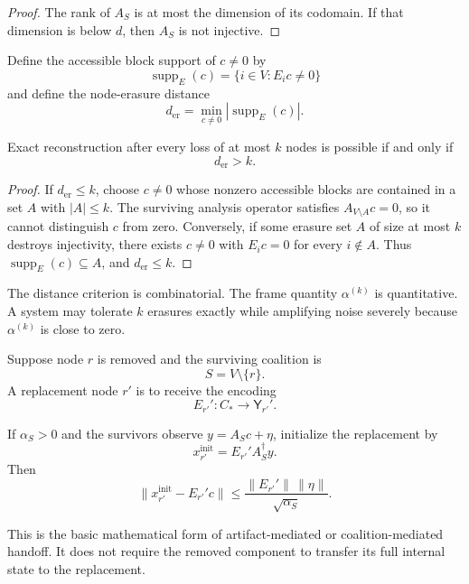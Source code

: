 \begin{proof}
The rank of \(A_S\) is at most the dimension of its codomain. If that
dimension is below \(d\), then \(A_S\) is not injective.
\end{proof}

Define the accessible block support of \(c\neq0\) by
\[
\operatorname{supp}_E(c)
=
\{i\in V:E_ic\neq0\}
\]
and define the node-erasure distance
\[
\boxed{
d_{\mathrm{er}}
=
\min_{c\neq0}|\operatorname{supp}_E(c)|.
}
\]

\begin{SRWTtheorem}
\label{SRWT:thm:erasure-distance}
Exact reconstruction after every loss of at most \(k\) nodes is possible if
and only if
\[
\boxed{
d_{\mathrm{er}}>k.
}
\]
\end{SRWTtheorem}

\begin{proof}
If \(d_{\mathrm{er}}\leq k\), choose \(c\neq0\) whose nonzero accessible
blocks are contained in a set \(A\) with \(|A|\leq k\). The surviving analysis
operator satisfies \(A_{V\setminus A}c=0\), so it cannot distinguish \(c\)
from zero. Conversely, if some erasure set \(A\) of size at most \(k\) destroys
injectivity, there exists \(c\neq0\) with \(E_ic=0\) for every \(i\notin A\).
Thus \(\operatorname{supp}_E(c)\subseteq A\), and
\(d_{\mathrm{er}}\leq k\).
\end{proof}

The distance criterion is combinatorial. The frame quantity
\(\alpha^{(k)}\) is quantitative. A system may tolerate \(k\) erasures exactly
while amplifying noise severely because \(\alpha^{(k)}\) is close to zero.


Suppose node \(r\) is removed and the surviving coalition is
\[
S=V\setminus\{r\}.
\]
A replacement node \(r'\) is to receive the encoding
\[
E_{r'}':C_*\to\mathsf Y_{r'}'.
\]

\begin{SRWTcorollary}\label{SRWT:cor:handoff-initialization}
If \(\alpha_S>0\) and the survivors observe \(y=A_Sc+\eta\), initialize the
replacement by
\[
x_{r'}^{\mathrm{init}}
=E_{r'}'A_S^\dagger y.
\]
Then
\[
\boxed{
\|x_{r'}^{\mathrm{init}}-E_{r'}'c\|
\leq
\frac{\|E_{r'}'\|\,\|\eta\|}{\sqrt{\alpha_S}}.
}
\]
\end{SRWTcorollary}

This is the basic mathematical form of artifact-mediated or
coalition-mediated handoff. It does not require the removed component to
transfer its full internal state to the replacement.

